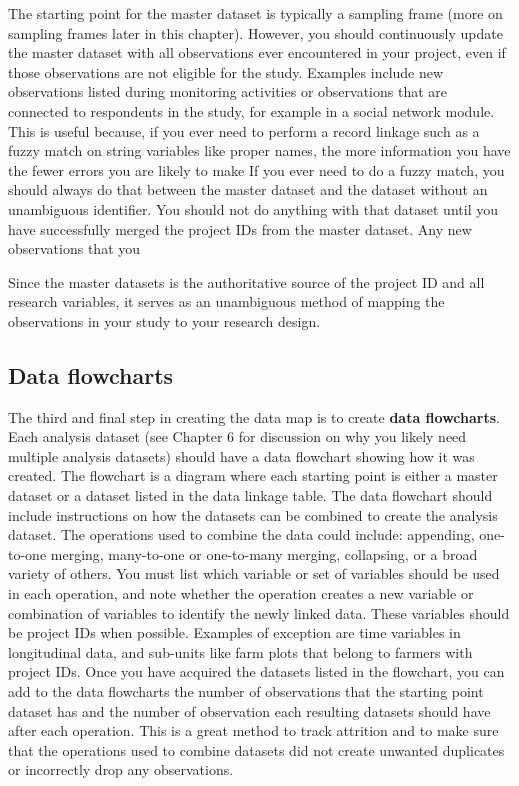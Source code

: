 The starting point for the master dataset is typically a sampling frame 
(more on sampling frames later in this chapter).
However, you should continuously update the master dataset with 
all observations ever encountered in your project,
even if those observations are not eligible for the study.
Examples include new observations listed during monitoring activities
or observations that are connected to respondents in the study,
for example in a social network module.
This is useful because, 
if you ever need to perform a record linkage such as a fuzzy match
on string variables like proper names,
the more information you have the fewer errors you are likely to make
If you ever need to do a fuzzy match,
you should always do that between the master dataset
and the dataset without an unambiguous identifier.
You should not do anything with that dataset until
you have successfully merged
the project IDs from the master dataset.
Any new observations that you

Since the master datasets is the authoritative source
of the project ID and all research variables,
it serves as an unambiguous method of mapping
the observations in your study to your research design.

\subsection{Data flowcharts}

The third and final step in creating the data map is to create \textbf{data flowcharts}.
Each analysis dataset
(see Chapter 6 for discussion on why you likely need multiple analysis datasets)
should have a data flowchart showing how it was created.
The flowchart is a diagram
where each starting point is either a master dataset
or a dataset listed in the data linkage table.
The data flowchart should include instructions on how
the datasets can be combined to create the analysis dataset.
The operations used to combine the data could include:
appending, one-to-one merging,
many-to-one or one-to-many merging, collapsing, or a broad variety of others.
You must list which variable or set of variables
should be used in each operation,
and note whether the operation creates a new variable or combination of variables
to identify the newly linked data.
These variables should be project IDs when possible.
Examples of exception are time variables in longitudinal data, 
and sub-units like farm plots that belong to farmers with project IDs.
Once you have acquired the datasets listed in the flowchart,
you can add to the data flowcharts the number of observations that
the starting point dataset has
and the number of observation each resulting datasets
should have after each operation.
This is a great method to track attrition and to make sure that
the operations used to combine datasets did not create unwanted duplicates
or incorrectly drop any observations.

